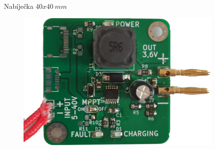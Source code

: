 \documentclass[%
  12pt,       				%
	t,                  %
	aspectratio=1610,   %
	unicode,						%
]{beamer}				    	%
\begin{document}
\begin{frame}
\begin{columns}
		\begin{column}{0.4\textwidth}
			\centering
			Nabíječka $40x40~mm$
			\begin{figure}
				\centering
				\vspace{8ex}
				\includegraphics[width=0.9\textwidth]{obrazky/batteryCharger-final.png}
			\end{figure}
		\end{column}
	\end{columns}
\end{frame}


\end{document}
